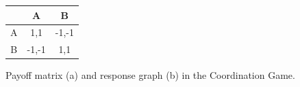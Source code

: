         \begin{figure}[H]
            \centering
            \begin{minipage}{0.45\textwidth}
                \centering
                \begin{tabular}{c|c|c}
                    & A & B \\ \hline
                    A & 1,1 & -1,-1 \\
                    B & -1,-1 & 1,1 \\
                \end{tabular}
                \vspace{2cm}
                \label{tab:coordination_game}
            \end{minipage}
            \hspace{0.3em}
            \begin{minipage}{0.45\textwidth}
                \centering
                \label{fig:coordination_game_dynamics}
            \end{minipage}
            \caption{Payoff matrix (a) and response graph (b) in the Coordination Game.}
            \label{fig:coordination_game}
        \end{figure}

